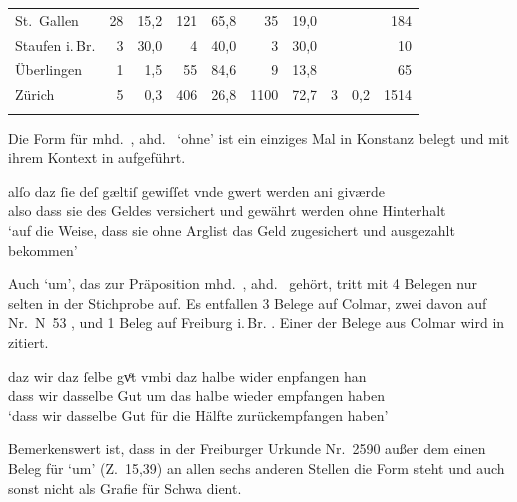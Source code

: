 \begin{table}
\begin{tabular}{
	l @{\qquad}
	r r @{\qquad}
	r r @{\qquad}
	r r @{\qquad}
	r r @{\qquad}
	r}
St.~Gallen
	& 28	& 15,2
	& 121	& 65,8
	& 35	& 19,0
	&		&
	& 184
	\\

Staufen i.\,Br.
	& 3 & 30,0
	& 4	& 40,0
	& 3	& 30,0
	&	&
	& 10
	\\

Überlingen
	& 1		& 1,5	
	& 55	& 84,6
	& 9		& 13,8
	&		&
	& 65
	\\

Zürich
	& 5		& 0,3
	& 406	& 26,8
	& 1100	& 72,7
	& 3		& 0,2
	& 1514
	\\

\lspbottomrule
\end{tabular}
\label{tab:ispelx}
\end{table}

Die Form  für mhd.~, ahd.~ `ohne' ist ein einziges
Mal in Konstanz belegt und mit ihrem Kontext in  aufgeführt.

\begin{exe}
\ex\label{ex:konst_ani}
	\gll alſo daz ſie deſ gæltiſ gewiſſet vnde gwert werden ani giværde \\
		also dass sie des Geldes versichert und gewährt werden ohne
			Hinterhalt \\
	\trans `auf die Weise, dass sie ohne Arglist das Geld zugesichert und
		ausgezahlt bekommen'
		\parencites(Nr.~17, Konstanz, 1251)[26,22]{cao1}
\end{exe}

Auch  `um', das zur Präposition mhd.~, ahd.~
gehört, tritt mit 4 Belegen nur selten in der Stichprobe auf. Es entfallen 3
Belege auf Colmar, zwei davon auf Nr.~N~53 \autocites(Colmar,
1264)[37,2--17]{cao5}, und 1 Beleg auf Freiburg i.\,Br. \autocites(Nr.~2580,
Freiburg i.\,Br., 1297)[9,21--33]{cao4}. Einer der Belege aus Colmar wird in
 zitiert.

\begin{exe}
\ex\label{ex:col_umbi}
	\gll daz wir {daz ſelbe} gvͦt vmbi daz halbe wider enpfangen han \\
		dass wir dasselbe Gut um das halbe wieder empfangen haben \\
	\trans `dass wir dasselbe Gut für die Hälfte  zurückempfangen haben'
		\parencites(Nr.~N~92, Colmar, 1269)[64,27--28]{cao5}
\end{exe}

Bemerkenswert ist, dass in der Freiburger Urkunde Nr.~2590
\autocite[15,32--16,4]{cao4} außer dem einen Beleg für  `um'
(Z.~15,39) an allen sechs anderen Stellen die Form  steht und 
auch sonst nicht als Grafie für Schwa dient.


